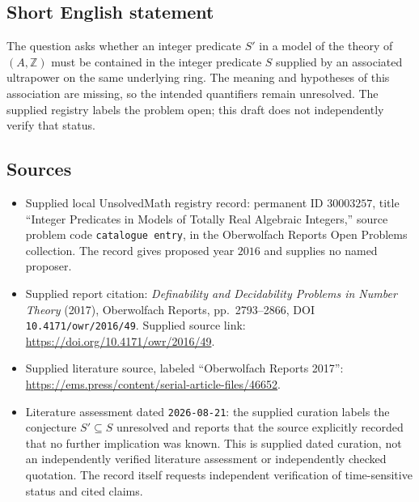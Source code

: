 \documentclass[11pt]{article}
\newcommand{\Z}{\mathbb{Z}}
\begin{document}
\subsection{Short English statement}
The question asks whether an integer predicate \(S'\) in a model of the theory of \((A,\Z)\) must be contained in the integer predicate \(S\) supplied by an associated ultrapower on the same underlying ring. The meaning and hypotheses of this association are missing, so the intended quantifiers remain unresolved. The supplied registry labels the problem open; this draft does not independently verify that status.
\subsection{Sources}
\begin{itemize}
\item Supplied local UnsolvedMath registry record: permanent ID \(30003257\), title ``Integer Predicates in Models of Totally Real Algebraic Integers,'' source problem code \texttt{catalogue entry}, in the Oberwolfach Reports Open Problems collection. The record gives proposed year \(2016\) and supplies no named proposer.
\item Supplied report citation: \emph{Definability and Decidability Problems in Number Theory} (2017), Oberwolfach Reports, pp.~2793--2866, DOI \texttt{10.4171/owr/2016/49}. Supplied source link: \url{https://doi.org/10.4171/owr/2016/49}.
\item Supplied literature source, labeled ``Oberwolfach Reports 2017'': \url{https://ems.press/content/serial-article-files/46652}.
\item Literature assessment dated \texttt{2026-08-21}: the supplied curation labels the conjecture \(S'\subseteq S\) unresolved and reports that the source explicitly recorded that no further implication was known. This is supplied dated curation, not an independently verified literature assessment or independently checked quotation. The record itself requests independent verification of time-sensitive status and cited claims.
\end{itemize}
\end{document}
